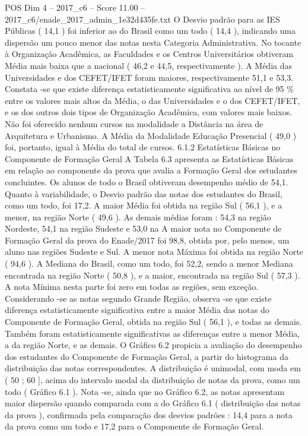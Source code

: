 \begin{textsample}{POS Dim 4 – 2017\_c6 – Score 11.00 – 2017\_c6/enade\_2017\_admin\_1e32d435fe.txt}
O Desvio padrão para as IES Públicas ( 14,1 ) foi inferior ao do Brasil como um todo ( 14,4 ), indicando uma dispersão um pouco menor das notas nesta Categoria Administrativa.
No tocante à Organização Acadêmica, as Faculdades e os Centros Universitários obtiveram Média mais baixa que a nacional ( 46,2 e 44,5, respectivamente ).
A Média das Universidades e dos CEFET/IFET foram maiores, respectivamente 51,1 e 53,3.
Constata -se que existe diferença estatisticamente significativa ao nível de 95 \% entre os valores mais altos da Média, o das Universidades e o dos CEFET/IFET, e os dos outros dois tipos de Organização Acadêmica, com valores mais baixos.
Não foi oferecido nenhum cursos na modalidade a Distância na área de Arquitetura e Urbanismo.
A Média da Modalidade Educação Presencial ( 49,0 ) foi, portanto, igual à Média do total de cursos. 6.1.2 Estatísticas Básicas no Componente de Formação Geral A Tabela 6.3 apresenta as Estatísticas Básicas em relação ao componente da prova que avalia a Formação Geral dos estudantes concluintes.
Os alunos de todo o Brasil obtiveram desempenho médio de 54,1.
Quanto à variabilidade, o Desvio padrão das notas dos estudantes do Brasil, como um todo, foi 17,2.
A maior Média foi obtida na região Sul ( 56,1 ), e a menor, na região Norte ( 49,6 ).
As demais médias foram : 54,3 na região Nordeste, 54,1 na região Sudeste e 53,0 na A maior nota no Componente de Formação Geral da prova do Enade/2017 foi 98,8, obtida por, pelo menos, um aluno nas regiões Sudeste e Sul.
A menor nota Máxima foi obtida na região Norte ( 94,6 ).
A Mediana do Brasil, como um todo, foi 52,2, sendo a menor Mediana encontrada na região Norte ( 50,8 ), e a maior, encontrada na região Sul ( 57,3 ).
A nota Mínima nesta parte foi zero em todas as regiões, sem exceção.
Considerando -se as notas segundo Grande Região, observa -se que existe diferença estatisticamente significativa entre a maior Média das notas do Componente de Formação Geral, obtida na região Sul ( 56,1 ), e todas as demais.
Também foram estatisticamente significativas as diferenças entre a menor Média, a da região Norte, e as demais.
O Gráfico 6.2 propicia a avaliação do desempenho dos estudantes do Componente de Formação Geral, a partir do histograma da distribuição das notas correspondentes.
A distribuição é unimodal, com moda em ( 50 ; 60 ], acima do intervalo modal da distribuição de notas da prova, como um todo ( Gráfico 6.1 ).
Nota -se, ainda que no Gráfico 6.2, as notas apresentam maior dispersão quando comparada com a do Gráfico 6.1 ( distribuição das notas da prova ), confirmada pela comparação dos desvios padrões : 14,4 para a nota da prova como um todo e 17,2 para o Componente de Formação Geral.

\end{textsample}
